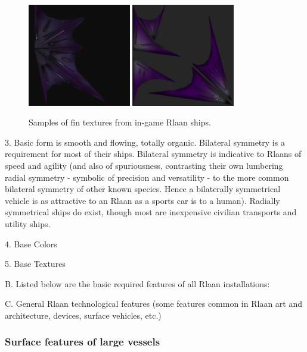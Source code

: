 \begin{figure} \begin{center}
	\includegraphics[width=0.4\textwidth]{../images/styles/rlaan-fins2.png}
    \includegraphics[width=0.4\textwidth]{../images/styles/rlaan-fins3.png}
    \caption{Samples of fin textures from in-game Rlaan ships.}
    \label{fig:rlaan-fins2}
\end{center} \end{figure}


3. Basic form is smooth and flowing, totally organic. Bilateral symmetry is a requirement 	for most of their ships. Bilateral symmetry is indicative to Rlaans of speed and agility (and 	also of 	spuriousness, contrasting their own lumbering radial symmetry - symbolic of 	precision and versatility - to the more common bilateral symmetry of other known species. 	Hence a bilaterally symmetrical vehicle is as attractive to an Rlaan as a sports car is to a 	human). Radially symmetrical ships do exist, though most are inexpensive civilian 	transports and utility ships.

4. Base Colors

5. Base Textures

	B. Listed below are the basic required features of all Rlaan installations:

	C. General Rlaan technological features (some features common in Rlaan art and architecture, devices, surface vehicles, etc.)


\subsubsection{Surface features of large vessels}

